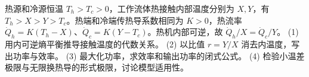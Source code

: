 热源和冷源恒温 \(T_h>T_c>0\)，工作流体热接触内部温度分别为 \(X,Y\)，有 \(T_h>X>Y>T_c\)。热端和冷端传热导系数相同为 \(K>0\)，热流率 \(\dot Q_h=K(T_h-X)\)、\(\dot Q_c=K(Y-T_c)\)。热机内部可逆，故 \(\dot Q_h/X=\dot Q_c/Y\)。
(1) 用内可逆熵平衡推导接触温度的代数关系。
(2) 以比值 \(r=Y/X\) 消去内温度，写出功率与效率。
(3) 最大化功率，求效率和输出功率的闭式公式。
(4) 检验小温差极限与无限换热导的形式极限，讨论模型适用性。
